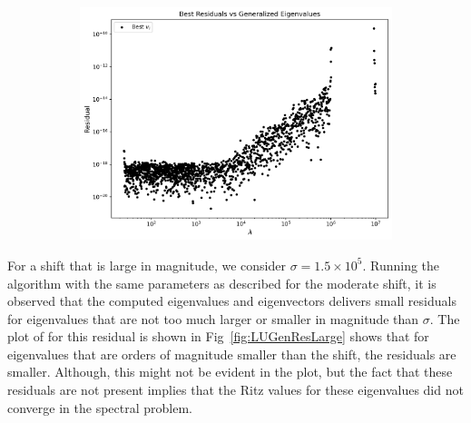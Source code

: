 \begin{figure}
	\begin{subfigure}{.5\textwidth}
		\centering
		\includegraphics[width=.8\linewidth]{./Plots/LU/residual_lu_bs.png}
		\caption{}
		\label{fig:LUBestResModerate}
	\end{subfigure}
\end{figure}


For a shift that is large in magnitude, we consider $\sigma = 1.5 \times 10^5$. Running the algorithm with the same parameters as described for the moderate shift, it is observed that the computed eigenvalues and eigenvectors delivers small residuals for eigenvalues that are not too much larger or smaller in magnitude than $\sigma$. The plot of for this residual is shown in Fig~\ref{fig:LUGenResLarge} shows that for eigenvalues that are orders of magnitude smaller than the shift, the residuals are  smaller. Although, this might not be evident in the plot, but the fact that these residuals are not present implies that the Ritz values for these eigenvalues did not converge in the spectral problem. 

